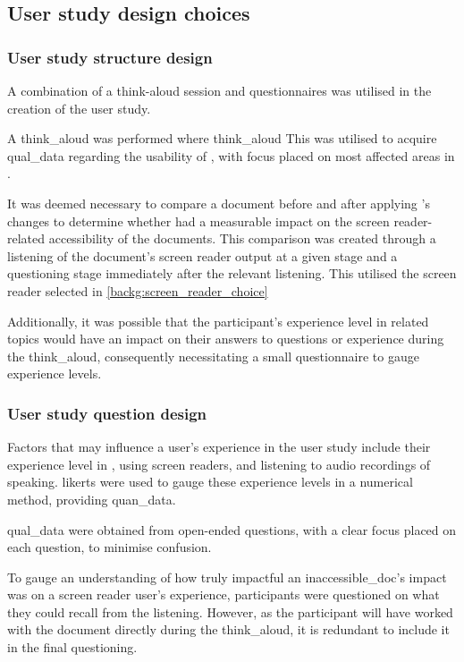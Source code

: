 \subsection{\nmu User \nmu study design choices}\label{backg:user_study_design}
\subsubsection{User study structure design}
A combination of a think-aloud session and questionnaires was utilised in the creation of the user study.

A \gls{think_aloud} was performed where \glsdesc{think_aloud} This was utilised to acquire \gls{qual_data} regarding the usability of \lintex , with focus placed on most affected areas in .

It was deemed necessary to compare a \latexspaced document before and after applying \lintex 's changes to determine whether \lintexspaced had a measurable impact on the screen reader-related accessibility of the documents. This comparison was created through a listening of the document's screen reader output at a given stage and a questioning stage immediately after the relevant listening. This utilised the screen reader selected in \cref{backg:screen_reader_choice}

Additionally, it was possible that the participant's experience level in related topics would have an impact on their answers to questions or experience during the \gls{think_aloud}, consequently necessitating a small questionnaire to gauge experience levels.
\subsubsection{User study question design}
Factors that may influence a user's experience in the user study include their experience level in \latex , using screen readers, and listening to audio recordings of speaking. \Glspl{likert} were used to gauge these experience levels in a numerical method, providing \gls{quan_data}.

\Gls{qual_data} were obtained from open-ended questions, with a clear focus placed on each question, to minimise confusion.

To gauge an understanding of how truly impactful an \gls{inaccessible_doc}'s impact was on a screen reader user's experience, participants were questioned on what they could recall from the listening. However, as the participant will have worked with the document directly during the \gls{think_aloud}, it is redundant to include it in the final questioning.

